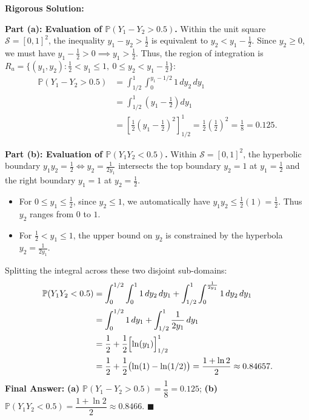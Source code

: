 \documentclass[11pt, letterpaper]{article}
\theoremstyle{definition}
\theoremstyle{remark}
\begin{document}
\textbf{Rigorous Solution:}

\textbf{Part (a): Evaluation of $\mathbb{P}(Y_1 - Y_2 > 0.5)$.}
Within the unit square $\mathcal{S} = [0, 1]^2$, the inequality $y_1 - y_2 > \frac{1}{2}$ is equivalent to $y_2 < y_1 - \frac{1}{2}$. Since $y_2 \ge 0$, we must have $y_1 - \frac{1}{2} > 0 \implies y_1 > \frac{1}{2}$. Thus, the region of integration is $R_a = \{(y_1, y_2) : \frac{1}{2} < y_1 \le 1,\ 0 \le y_2 < y_1 - \frac{1}{2}\}$:
\begin{align*}
    \mathbb{P}(Y_1 - Y_2 > 0.5) &= \int_{1/2}^{1} \int_{0}^{y_1 - 1/2} 1 \, dy_2 \, dy_1 \\
    &= \int_{1/2}^{1} \left( y_1 - \frac{1}{2} \right) dy_1 \\
    &= \left[ \frac{1}{2} \left( y_1 - \frac{1}{2} \right)^2 \right]_{1/2}^{1} = \frac{1}{2} \left(\frac{1}{2}\right)^2 = \frac{1}{8} = 0.125.
\end{align*}

\textbf{Part (b): Evaluation of $\mathbb{P}(Y_1 Y_2 < 0.5)$.}
Within $\mathcal{S} = [0, 1]^2$, the hyperbolic boundary $y_1 y_2 = \frac{1}{2} \iff y_2 = \frac{1}{2y_1}$ intersects the top boundary $y_2 = 1$ at $y_1 = \frac{1}{2}$ and the right boundary $y_1 = 1$ at $y_2 = \frac{1}{2}$.
\begin{itemize}
    \item For $0 \le y_1 \le \frac{1}{2}$, since $y_2 \le 1$, we automatically have $y_1 y_2 \le \frac{1}{2} (1) = \frac{1}{2}$. Thus $y_2$ ranges from $0$ to $1$.
    \item For $\frac{1}{2} < y_1 \le 1$, the upper bound on $y_2$ is constrained by the hyperbola $y_2 = \frac{1}{2y_1}$.
\end{itemize}
Splitting the integral across these two disjoint sub-domains:
\begin{align*}
    \mathbb{P}(Y_1 Y_2 < 0.5) &= \int_{0}^{1/2} \int_{0}^{1} 1 \, dy_2 \, dy_1 + \int_{1/2}^{1} \int_{0}^{\frac{1}{2y_1}} 1 \, dy_2 \, dy_1 \\
    &= \int_{0}^{1/2} 1 \, dy_1 + \int_{1/2}^{1} \frac{1}{2y_1} \, dy_1 \\
    &= \frac{1}{2} + \frac{1}{2} \Bigl[ \ln(y_1) \Bigr]_{1/2}^{1} \\
    &= \frac{1}{2} + \frac{1}{2} \bigl( \ln(1) - \ln(1/2) \bigr) = \frac{1 + \ln 2}{2} \approx 0.84657.
\end{align*}
\textbf{Final Answer:} \textbf{(a)} $\mathbb{P}(Y_1 - Y_2 > 0.5) = \dfrac{1}{8} = 0.125$; \quad \textbf{(b)} $\mathbb{P}(Y_1 Y_2 < 0.5) = \dfrac{1 + \ln 2}{2} \approx 0.8466$. $\blacksquare$
\end{document}
